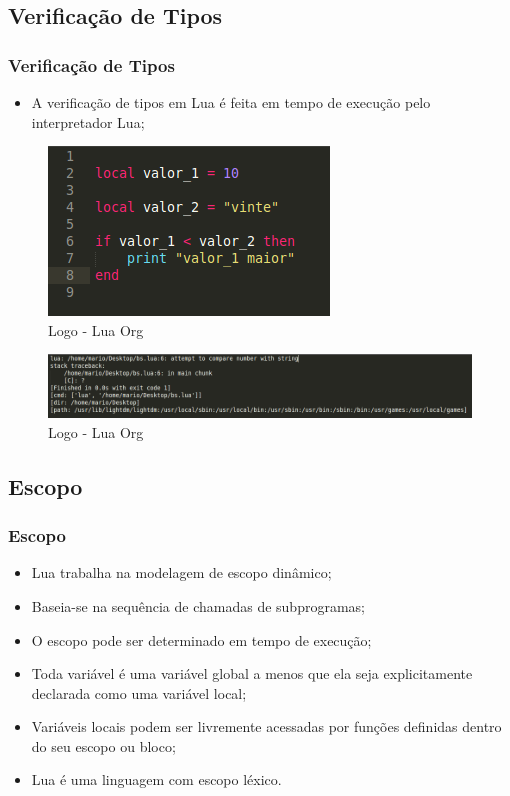 \documentclass{beamer}
\begin{document}
\subsection{Verificação de Tipos}
\begin{frame}[fragile]
\frametitle{Verificação de Tipos}
	\begin{itemize}
	\item A verificação de tipos em Lua é feita em tempo de execução pelo interpretador Lua;
	\end{itemize}
	\begin{figure}[!htb]
			\centering
			\includegraphics[width=0.3\linewidth]{imagens/verificacao_tipo2}
			\caption{Logo - Lua Org}
	\end{figure}

	\begin{figure}[!htb]
			\centering
			\includegraphics[width=1\linewidth]{imagens/verificacao_tipo}
			\caption{Logo - Lua Org}
	\end{figure}
\end{frame}

\subsection{Escopo}
\begin{frame}[fragile]
\frametitle{Escopo}
	\begin{itemize}
	\item<1-> Lua trabalha na modelagem de escopo dinâmico; 
	\item<2-> Baseia-se na sequência de chamadas de subprogramas;
	\item<3-> O escopo pode ser determinado em tempo de execução;
	\item<4-> Toda variável é uma variável global a menos que ela seja explicitamente declarada como uma variável local;
	\item<5-> Variáveis locais podem ser livremente acessadas por funções definidas dentro do seu escopo ou bloco;
	\item<6-> Lua é uma linguagem com escopo léxico.
	\end{itemize}
\end{frame}
\end{document}
